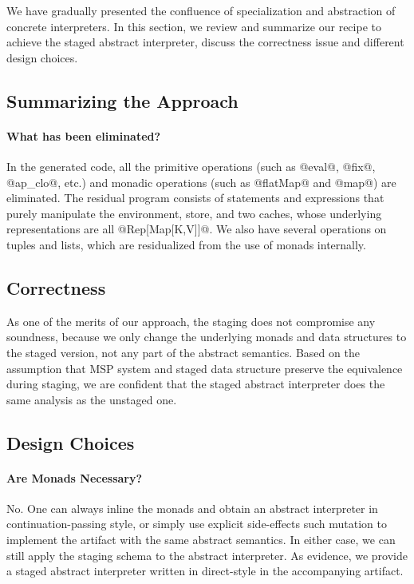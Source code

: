 We have gradually presented the confluence of specialization and abstraction of
concrete interpreters. In this section, we review and summarize our recipe
to achieve the staged abstract interpreter, discuss the correctness issue
and different design choices.

\subsection{Summarizing the Approach}


\paragraph{What has been eliminated?} In the generated code, all the
primitive operations (such as @eval@, @fix@, @ap_clo@, etc.) and monadic
operations (such as @flatMap@ and @map@) are eliminated. The residual program
consists of statements and expressions that purely manipulate the environment,
store, and two caches, whose underlying representations are all @Rep[Map[K,V]]@. We
also have several operations on tuples and lists, which are residualized from
the use of monads internally.


\subsection{Correctness}


As one of the merits of our approach, the staging does not compromise any
soundness, because we only change the underlying monads and data structures to
the staged version, not any part of the abstract semantics. Based on the
assumption that MSP system and staged data structure preserve the equivalence
during staging, we are confident that the staged abstract interpreter does the
same analysis as the unstaged one.

\subsection{Design Choices}

\paragraph{Are Monads Necessary?} No. One can always inline the monads and
obtain an abstract interpreter in continuation-passing style, or simply use
explicit side-effects such mutation to implement the artifact with the same
abstract semantics. In either case, we can still apply the staging schema to
the abstract interpreter. As evidence, we provide a staged abstract
interpreter written in direct-style in the accompanying artifact.


